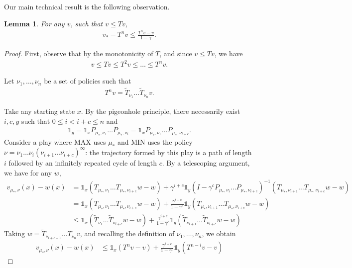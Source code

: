 \documentclass{article}
\newtheorem{lemma}{Lemma}
\def\1{{\mathds 1}}
\begin{document}
Our main technical result is the following observation.
\begin{lemma}
  For any $v$, such that $v\le Tv$,
  \begin{align}
    v_* - T^n v \le \frac{T^n v - v}{1-\gamma}.
  \end{align}
\end{lemma}
\begin{proof}
    First, observe that by the monotonicity of $T$, and since $v \le Tv$, we have
  \begin{align}
    v \le Tv \le T^2 v \le \dots \le T^n v.
  \end{align}
  
  Let $\nu_1,\dots,\nu_n$ be a set of policies such that
  \begin{align}
    T^n v = \tilde T_{\nu_1} \dots \tilde T_{\nu_n} v.
  \end{align}
  
  Take any starting state $x$. By the pigeonhole principle, there necessarily exist $i,c,y$ such that $0 \le i < i+c \le n$ and
  \begin{align}
    \1_y = \1_x P_{\mu_*,\nu_1} \dots P_{\mu_*,\nu_i} = \1_x P_{\mu_*,\nu_1} \dots P_{\mu_*,\nu_{i+c}}.
  \end{align}
  Consider a play where MAX uses $\mu_*$ and MIN uses the policy $\nu = \nu_1 \dots \nu_i (\nu_{i+1} \dots \nu_{i+c})^\infty$: the trajectory formed by this play is a path of length $i$ followed by an infinitely repeated cycle of length $c$.
  By a telescoping argument, we have for any $w$, 
  \begin{align}
    v_{\mu_*,\nu}(x) - w(x) & = \1_x (T_{\mu_*,\nu_1} \dots T_{\mu_*,\nu_{i+c}}w - w) + \gamma^{i+c} \1_y (I-\gamma^c P_{\mu_*,\nu_i} \dots P_{\mu_*,\nu_{i+c}})^{-1}(T_{\mu_*,\nu_{i+1}} \dots T_{\mu_*,\nu_{i+c}} w - w) \\
    & = \1_x (T_{\mu_*,\nu_1} \dots T_{\mu_*,\nu_{i+c}}w - w) + \frac{\gamma^{i+c}}{1-\gamma^c} \1_y (T_{\mu_*,\nu_{i+1}} \dots T_{\mu_*,\nu_{i+c}} w - w)  \\
    & \le \1_x (\tilde T_{\nu_1} \dots \tilde T_{\nu_{i+c}}w - w) + \frac{\gamma^{i+c}}{1-\gamma^c} \1_y (\tilde T_{\nu_{i+1}} \dots \tilde T_{\nu_{i+c}} w - w)
  \end{align}
  Taking $w = \tilde T_{\nu_{i+c+1}} \dots T_{\nu_{n}}v $, and recalling the definition of $\nu_1,\dots,\nu_n$, we obtain
  \begin{align}
    v_{\mu_*,\nu}(x) - w(x) & \le \1_x (T^n v - v) + \frac{\gamma^{i+c}}{1-\gamma^c} \1_y (T^{n-i}v - v)
  \end{align}
  


\end{proof}
\end{document}
